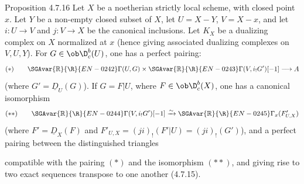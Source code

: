 \begin{statement}{Proposition 4.7.16}
Let $X$ be a noetherian strictly local scheme, with closed point $x$. Let $Y$ be a non-empty closed subset of $X$, let $U=X-Y$, $V=X-x$, and let $i:U\to V$ and $j:V\to X$ be the canonical inclusions. Let $K_X$ be a dualizing complex on $X$ normalized at $x$ (hence giving associated dualizing complexes on $V,U,Y$). For $G\in\ob\D_c^b(U)$, one has a perfect pairing:
\[
(*)\qquad \SGAvar{\mathbb{R}}{\R}{EN-0242}\Gamma(U,G)\times\SGAvar{\mathbb{R}}{\R}{EN-0243}\Gamma(V,i_!G')[-1]\longrightarrow A
\]
(where $G'=\underline{D}_U(G)$). If $G=F|U$, where $F\in\ob\D_c^b(X)$, one has a canonical isomorphism
\[
(**)\qquad \SGAvar{\mathbb{R}}{\R}{EN-0244}\Gamma(V,i_!G')[-1]\xrightarrow{\sim}\SGAvar{\mathbb{R}}{\R}{EN-0245}\Gamma_x(F'_{U,X})
\]
(where $F'=\underline{D}_X(F)$ and $F'_{U,X}=(ji)_!(F'|U)=(ji)_!(G')$), and a perfect pairing between the distinguished triangles
\begin{center}
\end{center}
compatible with the pairing $(*)$ and the isomorphism $(**)$, and giving rise to two exact sequences transpose to one another (4.7.15).
\end{statement}

